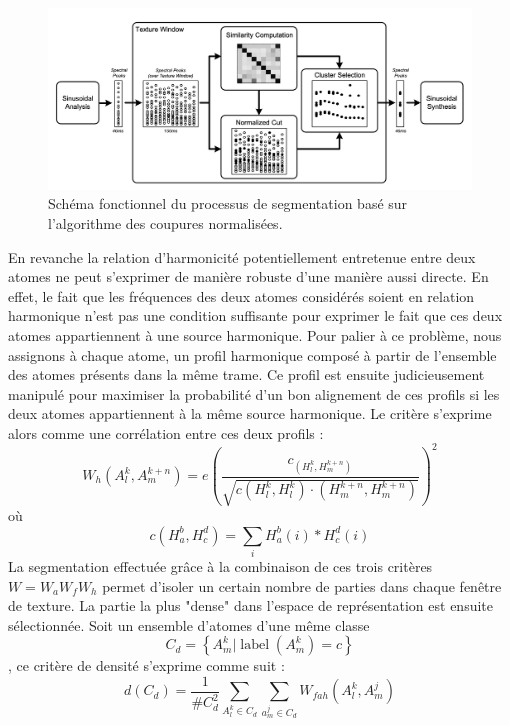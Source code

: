   \begin{figure}[t]
          \includegraphics[width=1\textwidth]{figures/ncutDiagram.png}
        \caption{Schéma fonctionnel du processus de segmentation basé sur l'algorithme des coupures normalisées.}  \label{fig:ncut}
\end{figure}

  En revanche la relation d'harmonicité potentiellement entretenue entre deux atomes ne peut s'exprimer de manière robuste d'une manière aussi directe. En effet, le fait que les fréquences des deux atomes considérés soient en relation harmonique n'est pas une condition suffisante pour exprimer le fait que ces deux atomes appartiennent à une source harmonique. Pour palier à ce problème, nous assignons à chaque atome, un profil harmonique composé à partir de l'ensemble des atomes présents dans la même trame. Ce profil est ensuite judicieusement manipulé pour maximiser la probabilité d'un bon alignement de ces profils si les deux atomes appartiennent à la même source harmonique\cite{lagrangeTaslp08}. Le critère s'exprime alors comme une corrélation entre ces deux profils :
  \begin{equation}
   { W _ { h } \left( A _ { l } ^ { k } , A _ { m } ^ { k + n } \right) = e \left( \frac { c _ { \left( H _ { l } ^ { k } , H _ { m } ^ { k + n } \right) } } { \sqrt { c \left( H _ { l } ^ { k } , H _ { l } ^ { k } \right) \cdot \left( H _ { m } ^ { k + n } , H _ { m } ^ { k + n } \right) } } \right) ^ { 2 } }
  \end{equation}
  où
  \begin{equation}
    { c \left( H _ { a } ^ { b } , H _ { c } ^ { d } \right) = \sum _ { i } H _ { a } ^ { b } ( i ) * H _ { c } ^ { d } ( i ) }
  \end{equation}
  La segmentation effectuée grâce à la combinaison de ces trois critères $W = W_a W_f W_h$ permet d'isoler un certain nombre de parties dans chaque fenêtre de texture. La partie la plus "dense" dans l'espace de représentation est ensuite sélectionnée. Soit un ensemble d'atomes d'une même classe
  $$C _ { d } = \left\{ A _ { m } ^ { k } | \operatorname { label } \left( A _ { m } ^ { k } \right) = c \right\}$$,
  ce critère de densité s'exprime comme suit :
  \begin{equation}
  d \left( C _ { d } \right) = \frac { 1 } { \# C _ { d } ^ { 2 } } \sum _ { A _ { l } ^ { k } \in C _ { d } } \sum _ { a _ { m } ^ { j } \in C _ { d } } W _ { f a h } \left( A _ { l } ^ { k } , A _ { m } ^ { j } \right)
  \end{equation}


